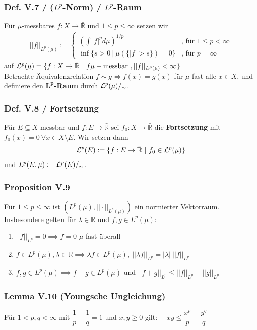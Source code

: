 \begin{frame}
\frametitle{Def. V.7 / ($L^p$-Norm) / $L^p$-Raum}
Für $\mu$-messbares $f: X \to \bar{\mathbb{R}}$ und $1 \leq p \leq \infty$ setzen wir
    \begin{align*}
      ||f||_{L^p(\mu)} := \begin{cases}
        (\int |f|^p d\mu)^{1/p} & \text{, für } 1\leq p < \infty\\
        \inf\{s>0 \ | \ \mu(\{|f| > s\})=0\} & \text{, für } p = \infty
      \end{cases}
    \end{align*}
    auf $\mathcal{L}^p(\mu) = \{f:X \to \bar{\mathbb{R}} \ | \ f \mu-\text{messbar }, ||f||_{L^p(\mu)} < \infty\}$\\
    Betrachte Äquivalenzrelation $f\sim g \Leftrightarrow f(x) = g(x)$ für $\mu$-fast alle $x \in X$, und definiere den $\bm{L^p}$\textbf{-Raum} durch $\mathcal{L}^p(\mu)/_{\sim}$.
\end{frame}


\begin{frame}
\frametitle{Def. V.8 / Fortsetzung}
Für $E \subseteq X$ messbar und $f: E \to \bar{\mathbb{R}}$ sei $f_0: X\to \bar{\mathbb{R}}$ die \textbf{Fortsetzung} mit $f_0(x)=0 \ \forall x \in X \setminus E$. Wir setzen dann
    \begin{align*}
      \mathcal{L}^p(E) := \{f:E \to \bar{\mathbb{R}} \ | \ f_0 \in \mathcal{L}^p(\mu)\}
    \end{align*}
    und $L^p(E,\mu) := \mathcal{L}^p(E)/_{\sim}$.
\end{frame}


\begin{frame}
\frametitle{Proposition V.9}
Für $1 \leq p \leq \infty$ ist $(L^p(\mu), ||\cdot||_{L^p(\mu)})$ ein normierter Vektorraum. Insbesondere gelten für $\lambda \in \mathbb{R}$ und $f,g \in L^p(\mu)$:
    \begin{enumerate}[label=\roman*)]
      \item $||f||_{L^p} = 0 \implies f = 0$ $\mu$-fast überall
      \item $f \in L^p(\mu), \lambda \in \mathbb{R} \implies \lambda f \in L^p(\mu), \ ||\lambda f||_{L^p} = |\lambda| \ ||f||_{L^p}$
      \item $f,g \in L^p(\mu) \implies f+g \in L^p(\mu)$ und $||f+g||_{L^p} \leq ||f||_{L^p} + ||g||_{L^p}$
    \end{enumerate}
\end{frame}


\begin{frame}
\frametitle{Lemma V.10 (Youngsche Ungleichung)}
Für $1 < p,q < \infty$ mit $\dfrac{1}{p} + \dfrac{1}{q} = 1$ und $x,y \geq 0$ gilt: \ \ $xy \leq \dfrac{x^p}{p} + \dfrac{y^q}{q}$
\end{frame}


